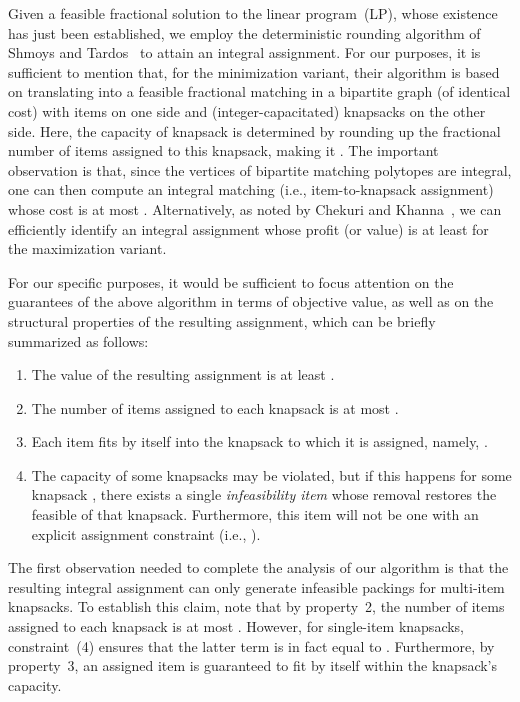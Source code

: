 \documentclass[11pt]{article}
\theoremstyle{plain}
\theoremstyle{definition}
\begin{document}
\smallskip {} Given a feasible fractional solution  to the linear program~(LP), whose existence has just been established, we employ the deterministic rounding algorithm of Shmoys and Tardos~\cite{ShmoysT93} to attain an integral assignment. For our purposes, it is sufficient to mention that,
for the minimization variant, their algorithm is based on translating  into a feasible fractional matching in a bipartite graph (of identical cost) with items on one side and (integer-capacitated) knapsacks on the other side. Here, the capacity of knapsack  is determined by rounding up the fractional number of items assigned to this knapsack, making it . The important observation is that, since the vertices of bipartite matching polytopes are integral, one can then compute an integral matching (i.e., item-to-knapsack assignment) whose cost is at most . Alternatively, as noted by Chekuri and Khanna~\cite{ChekuriK05}, we can efficiently identify an integral assignment whose profit (or value) is at least  for the maximization variant.

For our specific purposes, it would be sufficient to focus attention on the guarantees of the above algorithm in terms of objective value, as well as on the structural properties of the resulting assignment, which can be briefly summarized as follows:
\begin{enumerate}
\item The value of the resulting assignment is at least .

\item The number of items assigned to each knapsack  is at most .

\item Each item  fits by itself into the knapsack  to which it is assigned, namely, .

\item The capacity of some knapsacks may be violated, but if this happens for some knapsack , there exists a single \textit{infeasibility item}  whose removal restores the feasible of that knapsack. Furthermore, this item will not be one with an explicit assignment constraint (i.e., ).
\end{enumerate}

 The first observation needed to complete the analysis of our algorithm is that the resulting integral assignment can only generate infeasible packings for multi-item knapsacks. To establish this claim, note that by property~2, the number of items assigned to each knapsack  is at most . However, for single-item knapsacks, constraint~(4) ensures that the latter term is in fact equal to . Furthermore, by property~3, an assigned item is guaranteed to fit by itself within the knapsack's capacity.
\end{document}
